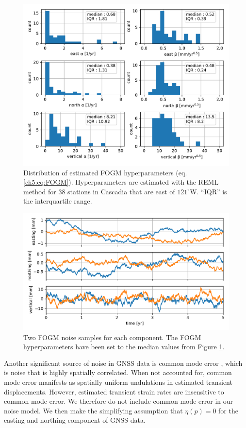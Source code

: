 \begin{figure}
\includegraphics{ch5/figures/noise/noise-params.pdf}
\caption{Distribution of estimated FOGM hyperparameters (eq. \ref{ch5:eq:FOGM}). Hyperparameters are estimated with the REML method for 38 stations in Cascadia that are east of $121^\circ$W. ``IQR'' is the interquartile range.}   
\label{ch5:fig:NoiseParams}
\end{figure}

\begin{figure}
\includegraphics{ch5/figures/noise/noise-samples.pdf}
\caption{Two FOGM noise samples for each component. The FOGM hyperparameters have been set to the median values from Figure \ref{ch5:fig:NoiseParams}.}   
\label{ch5:fig:NoiseSamples}
\end{figure}

Another significant source of noise in GNSS data is common mode error \citep[e.g.,][]{Wdowinski1997,Dong2006}, which is noise that is highly spatially correlated. When not accounted for, common mode error manifests as spatially uniform undulations in estimated transient displacements. However, estimated transient strain rates are insensitive to common mode error. We therefore do not include common mode error in our noise model. We then make the simplifying assumption that $\eta(p) = 0$ for the easting and northing component of GNSS data.  

